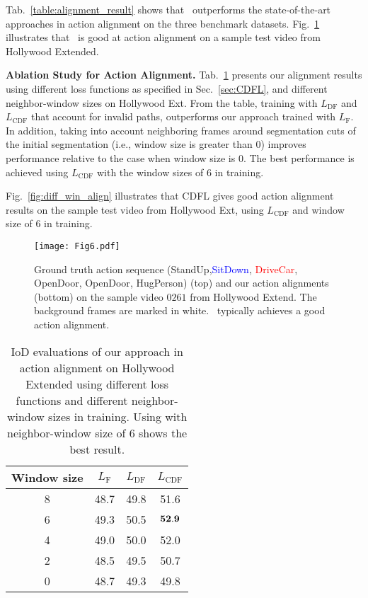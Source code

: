 \documentclass[10pt,twocolumn,letterpaper]{article}
\begin{document}
Tab.~\ref{table:alignment_result} shows that \abbrmodel \ outperforms the state-of-the-art approaches in action alignment on the three benchmark datasets. Fig.~\ref{fig:alignement} illustrates that \abbrmodel \ is good at action alignment on a sample test video from Hollywood Extended.


{\bf  Ablation Study for Action Alignment.} Tab.~\ref{table:Different Training Strategies on alignment} presents our alignment results using different loss functions as specified in Sec.~\ref{sec:CDFL}, and different neighbor-window sizes on Hollywood Ext. From the table, training with $L_{\text{DF}}$ and $L_{\text{CDF}}$ that account for invalid paths, outperforms our approach trained with $L_{\text{F}}$. In addition, taking into account neighboring frames around segmentation cuts of the initial segmentation (i.e., window size is greater than $0$) improves performance relative to the case when window size is $0$. The best performance is achieved using $L_{\text{CDF}}$ with the window sizes of $6$ in training. 

Fig.~\ref{fig:diff_win_align} illustrates that CDFL gives good action alignment results on the sample test video from Hollywood Ext, using $L_{\text{CDF}}$ and window size of $6$ in training.

\begin{figure}[!tp]
\centering
\texttt{[image: Fig6.pdf]}
\caption{Ground truth action sequence (\textcolor{mypink}{StandUp},\textcolor{blue}{SitDown}, \textcolor{red}{DriveCar}, \textcolor{mygreen}{OpenDoor}, \textcolor{mygreen}{OpenDoor}, \textcolor{myyellow}{HugPerson}) (top) and our action alignments (bottom) on the sample video $\textit{0261}$ from Hollywood Extend. The background frames are marked in white. \abbrmodel\ typically achieves a good action alignment.}
\label{fig:alignement}
\end{figure}

\begin{table}
\begin{center}
\begin{tabular}{|c|c|c|c|}
\hline  Window size & $L_\text{F}$ & $L_\text{DF}$& $L_\text{CDF}$\\
\hline 8 & 48.7 & 49.8 & 51.6\\
\hline 6 & 49.3 & 50.5 & ${\bf 52.9}$\\
\hline 4 & 49.0 & 50.0 & 52.0\\
\hline 2 & 48.5 & 49.5 & 50.7\\
\hline 0 & 48.7 & 49.3 & 49.8\\
\hline
\end{tabular}
\end{center}
\caption{IoD evaluations of our approach in action alignment on Hollywood Extended using different loss functions and different neighbor-window sizes in training. Using \abbrmodel{} with neighbor-window size of $6$ shows the best result.}
\label{table:Different Training Strategies on alignment}
\end{table}
\end{document}
